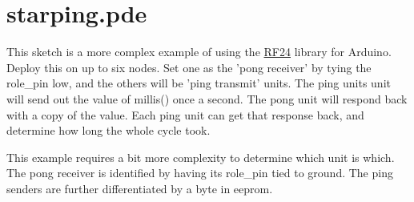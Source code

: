 \hypertarget{starping_8pde-example}{\section{starping.\+pde}
}
This sketch is a more complex example of using the \hyperlink{class_r_f24}{R\+F24} library for Arduino. Deploy this on up to six nodes. Set one as the 'pong receiver' by tying the role\+\_\+pin low, and the others will be 'ping transmit' units. The ping units unit will send out the value of millis() once a second. The pong unit will respond back with a copy of the value. Each ping unit can get that response back, and determine how long the whole cycle took.

This example requires a bit more complexity to determine which unit is which. The pong receiver is identified by having its role\+\_\+pin tied to ground. The ping senders are further differentiated by a byte in eeprom.


\begin{DoxyCodeInclude}
\end{DoxyCodeInclude}
 